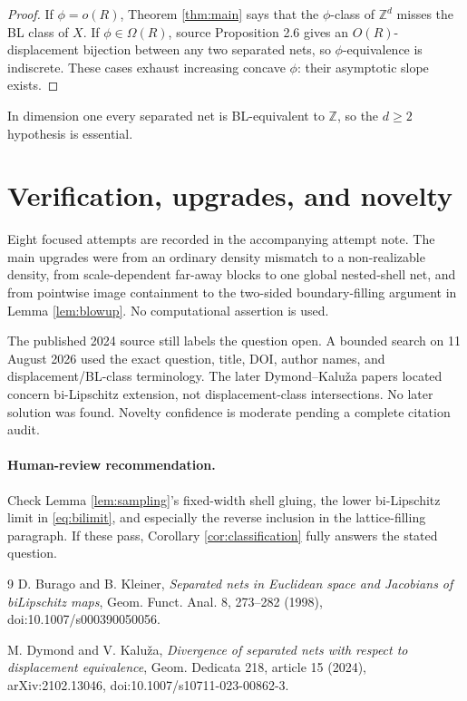 \documentclass[10pt]{article}
\newcommand{\Z}{\mathbb Z}
\begin{document}
\begin{proof}
If $\phi=o(R)$, Theorem \ref{thm:main} says that the $\phi$-class of
$\Z^d$ misses the BL class of $X$.  If $\phi\in\Omega(R)$, source
Proposition 2.6 gives an $O(R)$-displacement bijection between any two
separated nets, so $\phi$-equivalence is indiscrete.  These cases exhaust
increasing concave $\phi$: their asymptotic slope exists.
\end{proof}

In dimension one every separated net is BL-equivalent to $\Z$, so the
$d\ge2$ hypothesis is essential.

\section{Verification, upgrades, and novelty}

Eight focused attempts are recorded in the accompanying attempt note.  The
main upgrades were from an ordinary density mismatch to a non-realizable
density, from scale-dependent far-away blocks to one global nested-shell net,
and from pointwise image containment to the two-sided boundary-filling
argument in Lemma \ref{lem:blowup}.  No computational assertion is used.

The published 2024 source still labels the question open.  A bounded search
on 11 August 2026 used the exact question, title, DOI, author names, and
displacement/BL-class terminology.  The later Dymond--Kaluža papers located
concern bi-Lipschitz extension, not displacement-class intersections.  No
later solution was found.  Novelty confidence is moderate pending a complete
citation audit.

\paragraph{Human-review recommendation.}
Check Lemma \ref{lem:sampling}'s fixed-width shell gluing, the lower
bi-Lipschitz limit in \eqref{eq:bilimit}, and especially the reverse inclusion
in the lattice-filling paragraph.  If these pass, Corollary
\ref{cor:classification} fully answers the stated question.

\begin{thebibliography}{9}
D. Burago and B. Kleiner,
\emph{Separated nets in Euclidean space and Jacobians of biLipschitz maps},
Geom. Funct. Anal. 8, 273--282 (1998),
doi:10.1007/s000390050056.

M. Dymond and V. Kaluža,
\emph{Divergence of separated nets with respect to displacement equivalence},
Geom. Dedicata 218, article 15 (2024), arXiv:2102.13046,
doi:10.1007/s10711-023-00862-3.
\end{thebibliography}
\end{document}
